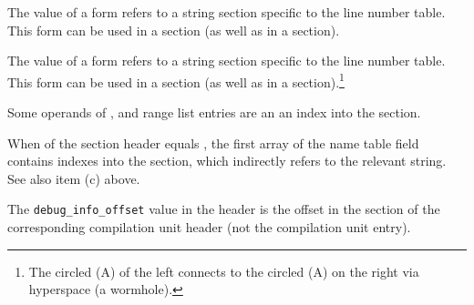 \begin{description}
The value of a \DWFORMlinestrp{} form refers to a
string section specific to the line number table.
This form can be used in a \dotdebugline{} section
(as well as in a \dotdebuginfo{} section).

The value of a \DWFORMlinestrp{} form refers to a
string section specific to the line number table.
This form can be used in a \dotdebuginfo{} section
(as well as in a \dotdebugline{} section).\footnote{
\bb
The circled (A) of the left connects to the circled
(A) on the right
\eb
via hyperspace (a wormhole).}
\bb

Some operands of \DWRLEbaseaddressx, \DWRLEstartxendx{} and
\DWRLEstartxlength{} range list entries are an
an index into the \dotdebugaddr{} section.
\eb

%
\bb
{}
When \HFNstrformat{} of the section header equals \DWFORMstrxfour{},
the first array of the name table
field contains indexes into the \dotdebugstroffsets{} section,
which indirectly refers to the relevant string.
See also item (c) above.
\eb

\bb
%
The \texttt{debug\_info\_offset} value in
the header is
the offset in the \dotdebuginfo{} section of the
corresponding compilation unit header (not the compilation
unit entry).
\eb


\end{description}



